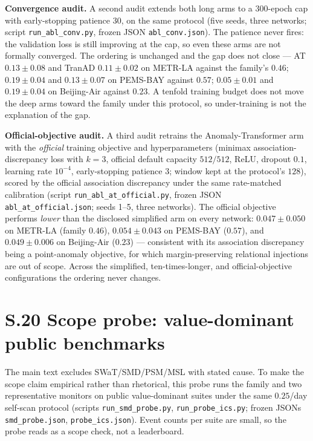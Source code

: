 \documentclass[11pt,a4paper]{article}
\begin{document}
\medskip
\noindent\textbf{Convergence audit.} A second audit extends both long
arms to a 300-epoch cap with early-stopping patience 30, on the same
protocol (five seeds, three networks; script \texttt{run\_abl\_conv.py},
frozen JSON \texttt{abl\_conv.json}). The patience never fires: the
validation loss is still improving at the cap, so even these arms are
not formally converged. The ordering is unchanged and the gap does not
close --- AT $0.13{\pm}0.08$ and TranAD $0.11{\pm}0.02$ on METR-LA
against the family's $0.46$; $0.19{\pm}0.04$ and $0.13{\pm}0.07$ on
PEMS-BAY against $0.57$; $0.05{\pm}0.01$ and $0.19{\pm}0.04$ on
Beijing-Air against $0.23$. A tenfold training budget does not move the
deep arms toward the family under this protocol, so under-training is
not the explanation of the gap.

\medskip
\noindent\textbf{Official-objective audit.} A third audit retrains the
Anomaly-Transformer arm with the \emph{official} training objective and
hyperparameters (minimax association-discrepancy loss with $k{=}3$,
official default capacity $512/512$, ReLU, dropout $0.1$, learning rate
$10^{-4}$, early-stopping patience 3; window kept at the protocol's
$128$), scored by the official association discrepancy under the same
rate-matched calibration (script \texttt{run\_abl\_at\_official.py},
frozen JSON \texttt{abl\_at\_official.json}; seeds 1--5, three
networks). The official objective performs \emph{lower} than the
disclosed simplified arm on every network: $0.047{\pm}0.050$ on METR-LA
(family $0.46$), $0.054{\pm}0.043$ on PEMS-BAY ($0.57$), and
$0.049{\pm}0.006$ on Beijing-Air ($0.23$) --- consistent with its
association discrepancy being a point-anomaly objective, for which
margin-preserving relational injections are out of scope. Across the
simplified, ten-times-longer, and official-objective configurations the
ordering never changes.

\section*{S.20 Scope probe: value-dominant public benchmarks}

The main text excludes SWaT/SMD/PSM/MSL with stated cause. To make the
scope claim empirical rather than rhetorical, this probe runs the family
and two representative monitors on public value-dominant suites under
the same $0.25$/day self-scan protocol (scripts
\texttt{run\_smd\_probe.py}, \texttt{run\_probe\_ics.py}; frozen JSONs
\texttt{smd\_probe.json}, \texttt{probe\_ics.json}). Event counts per
suite are small, so the probe reads as a scope check, not a leaderboard.
\end{document}
